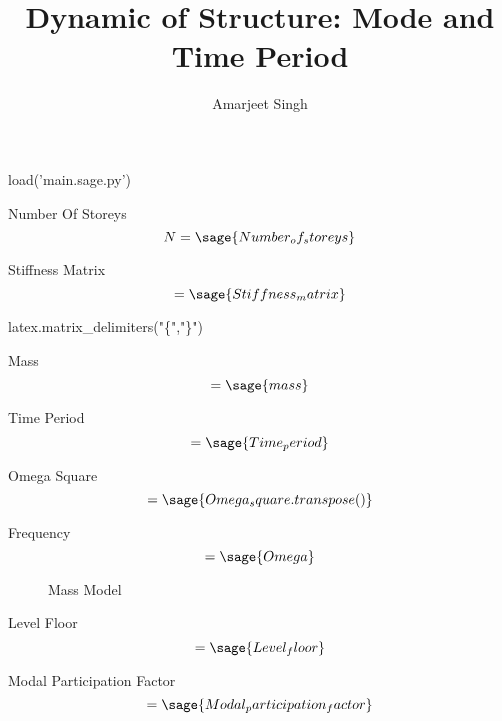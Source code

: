 \documentclass[12pt]{report}
\title{Dynamic of Structure: Mode and Time Period}
\author{Amarjeet Singh }
\begin{document}
\setcounter{chapter}{1}
\thispagestyle{plain}
	\begin{titlepage}
\maketitle
	\end{titlepage}

\begin{sagesilent}
	load('main.sage.py')

\end{sagesilent}

Number Of Storeys
\begin{equation}
	N = \sage{Number_of_storeys}
\end{equation}

Stiffness Matrix
\begin{equation}
	[K]=\sage{Stiffness_matrix}
\end{equation}

\begin{sagesilent}
latex.matrix_delimiters("\{","\}")
\end{sagesilent}


Mass
\begin{equation}
	 [M]=\sage{mass}
\end{equation}



Time Period
\begin{equation}
	[T]=\sage{Time_period}
\end{equation}

Omega Square
\begin{equation}
	[\omega^2] =\sage{Omega_square.transpose()}
\end{equation}

Frequency
\begin{equation}
	[\omega]=\sage{Omega}
\end{equation}

\begin{figure}
	\caption{Mass Model}
\end{figure}

Level Floor
\begin{equation}
	[L]=\sage{Level_floor}
\end{equation}

Modal Participation Factor
\begin{equation}
	 [p]=\sage{Modal_participation_factor}
\end{equation}
\end{document}
